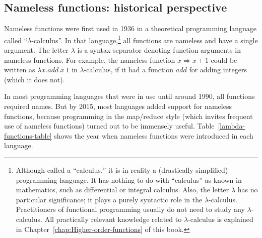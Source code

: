 \subsection{Nameless functions: historical perspective}

Nameless functions were first used in 1936 in a theoretical programming
language called ``$\lambda$-calculus''.
In that language,\footnote{Although called a ``calculus,'' it is in reality a (drastically
simplified) programming language. It has nothing to do with ``calculus''
as known in mathematics, such as differential or integral calculus.
Also, the letter $\lambda$ has no particular significance; it plays
a purely syntactic role in the $\lambda$-calculus. Practitioners
of functional programming usually do not need to study any $\lambda$-calculus.
All practically relevant knowledge related to $\lambda$-calculus
is explained in Chapter~\ref{chap:Higher-order-functions} of this
book.} all functions are nameless and have a single argument. The letter
$\lambda$ is a syntax separator denoting function arguments in nameless
functions. For example, the nameless function $x\Rightarrow x+1$
could be written as $\lambda x.add~x~1$ in $\lambda$-calculus, if
it had a function $add$ for adding integers (which it does not).

In most programming languages that were in use until around 1990,
all functions required names. But by 2015, most languages added support
for nameless functions, because programming in the map/reduce style
(which invites frequent use of nameless functions) turned out to be
immensely useful. Table\ \ref{lambda-functions-table} shows the
year when nameless functions were introduced in each language.

